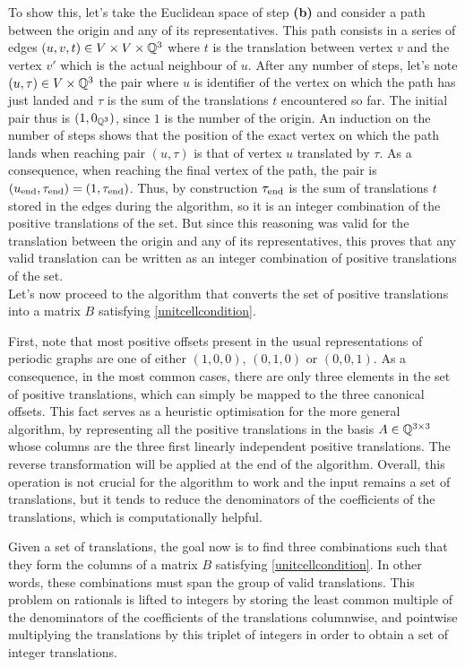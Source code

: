 \documentclass[main.tex]{subfiles}
\begin{document}
To show this, let's take the Euclidean space of step {\sffamily\small\bfseries(b)} and consider a path between the origin and any of its representatives. This path consists in a series of edges $(u,v,t)\in V\times V\times\mathbb{Q}^3$ where $t$ is the translation between vertex $v$ and the vertex $v'$ which is the actual neighbour of $u$. After any number of steps, let's note $(u,\tau)\in V\times\mathbb{Q}^3$ the pair where $u$ is identifier of the vertex on which the path has just landed and $\tau$ is the sum of the translations $t$ encountered so far. The initial pair thus is $(1,0_{\mathbb{Q}^3})$, since $1$ is the number of the origin. An induction on the number of steps shows that the position of the exact vertex on which the path lands when reaching pair $(u,\tau)$ is that of vertex $u$ translated by $\tau$. As a consequence, when reaching the final vertex of the path, the pair is $(u_\text{end},\tau_\text{end}) = (1,\tau_\text{end})$. Thus, by construction $\tau_\text{end}$ is the sum of translations $t$ stored in the edges during the algorithm, so it is an integer combination of the positive translations of the set. But since this reasoning was valid for the translation between the origin and any of its representatives, this proves that any valid translation can be written as an integer combination of positive translations of the set.\\

Let's now proceed to the algorithm that converts the set of positive translations into a matrix $B$ satisfying \cref{unitcellcondition}.

First, note that most positive offsets present in the usual representations of periodic graphs are one of either $(1,0,0)$, $(0,1,0)$ or $(0,0,1)$. As a consequence, in the most common cases, there are only three elements in the set of positive translations, which can simply be mapped to the three canonical offsets. This fact serves as a heuristic optimisation for the more general algorithm, by representing all the positive translations in the basis $A\in\mathbb{Q}^{3\times3}$ whose columns are the three first linearly independent positive translations. The reverse transformation will be applied at the end of the algorithm. Overall, this operation is not crucial for the algorithm to work and the input remains a set of translations, but it tends to reduce the denominators of the coefficients of the translations, which is computationally helpful.

Given a set of translations, the goal now is to find three combinations such that they form the columns of a matrix $B$ satisfying \cref{unitcellcondition}. In other words, these combinations must span the group of valid translations. This problem on rationals is lifted to integers by storing the least common multiple of the denominators of the coefficients of the translations columnwise, and pointwise multiplying the translations by this triplet of integers in order to obtain a set of integer translations.
\end{document}
